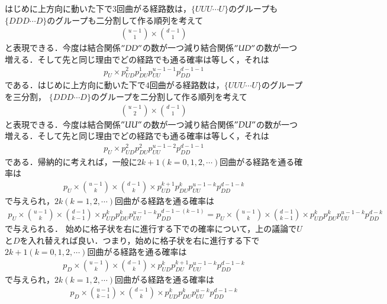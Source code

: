 \documentclass[a4j,papersize,disablejfam,slide,14pt]{jsarticle}
\begin{document}
    はじめに上方向に動いた下で$3$回曲がる経路数は，$\{UUU\cdots U\}$のグループも
    $\{DDD\cdots D\}$のグループも二分割して作る順列を考えて
    \begin{align}
    	\binom{u-1}{1} \times \binom{d-1}{1}
    \end{align}
    と表現できる．今度は結合関係$"DD"$の数が一つ減り結合関係$"UD"$の数が一つ増える．そして先と同じ理由でどの経路でも通る確率は等しく，それは
    \begin{align}
    	p_U \times p_{UD}^2 p_{DU}^1 p_{UU}^{u-1-1} p_{DD}^{d-1-1}
    \end{align}
    である．はじめに上方向に動いた下で$4$回曲がる経路数は，$\{UUU\cdots U\}$のグループを三分割，
    $\{DDD\cdots D\}$のグループを二分割して作る順列を考えて
    \begin{align}
    	\binom{u-1}{2} \times \binom{d-1}{1}
    \end{align}
    と表現できる．今度は結合関係$"UU"$の数が一つ減り結合関係$"DU"$の数が一つ増える．そして先と同じ理由でどの経路でも通る確率は等しく，それは
    \begin{align}
    	p_U \times p_{UD}^2 p_{DU}^2 p_{UU}^{u-1-2} p_{DD}^{d-1-1}
    \end{align}
    である．帰納的に考えれば，一般に$2k+1(k=0,1,2,\cdots)$回曲がる経路を通る確率は
    \begin{align}
    	p_U \times \binom{u-1}{k} \times \binom{d-1}{k} \times p_{UD}^{k+1} p_{DU}^k p_{UU}^{u-1-k} p_{DD}^{d-1-k}
    \end{align}
    で与えられ，$2k(k=1,2,\cdots)$回曲がる経路を通る確率は
    \begin{align}
    	p_U \times \binom{u-1}{k} \times \binom{d-1}{k-1} \times p_{UD}^{k} p_{DU}^{k} p_{UU}^{u-1-k} p_{DD}^{d-1-(k-1)} 
        = p_U \times \binom{u-1}{k} \times \binom{d-1}{k-1} \times p_{UD}^{k} p_{DU}^{k} p_{UU}^{u-1-k} p_{DD}^{d-k}
    \end{align}
    で与えられる．
    始めに格子状を右に進行する下での確率について，上の議論で$U$と$D$を入れ替えれば良い．つまり，始めに格子状を右に進行する下で
    $2k+1(k=0,1,2,\cdots)$回曲がる経路を通る確率は
    \begin{align}
    	p_D \times \binom{u-1}{k} \times \binom{d-1}{k} \times p_{UD}^k p_{DU}^{k+1} p_{UU}^{u-1-k} p_{DD}^{d-1-k}
    \end{align}
    で与えられ，$2k(k=1,2,\cdots)$回曲がる経路を通る確率は
    \begin{align}
    	p_D \times \binom{u-1}{k-1} \times \binom{d-1}{k} \times p_{UD}^{k} p_{DU}^{k} p_{UU}^{u-k} p_{DD}^{d-1-k}
    \end{align}
\end{document}
